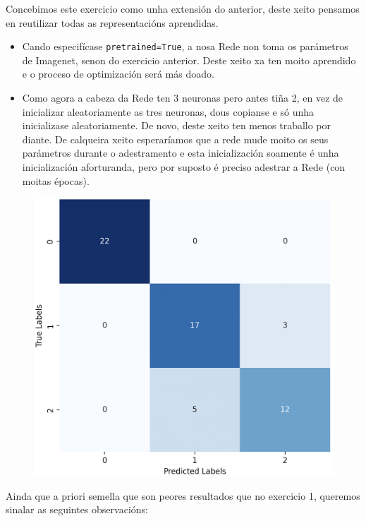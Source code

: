 \documentclass{article}
\begin{document}
Concebimos este exercicio como unha extensión do anterior, deste xeito pensamos en reutilizar todas as representacións aprendidas.
\begin{itemize}
	\item Cando especifícase \texttt{pretrained=True}, a nosa Rede non toma os parámetros de Imagenet, senon do exercicio anterior. Deste xeito xa ten moito aprendido e o proceso de optimización será más doado.
	\item Como agora a cabeza da Rede ten 3 neuronas pero antes tiña 2, en vez de inicializar aleatoriamente as tres neuronas, dous copianse e só unha inicializase aleatoriamente. De novo, deste xeito ten menos traballo por diante. De calqueira xeito esperaríamos que a rede mude moito os seus parámetros durante o adestramento e esta inicialización soamente é unha inicialización aforturanda, pero por suposto é preciso adestrar a Rede (con moitas épocas).

\end{itemize}


\begin{figure}
	\includegraphics[width=1\linewidth]{cmEj2} 
	\label{fig:cmEj2}
\end{figure}

Ainda que a priori semella que son peores resultados que no exercicio 1, queremos sinalar as seguintes observacións:
\end{document}
